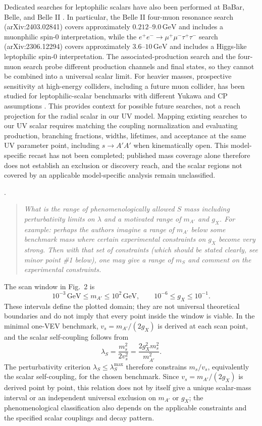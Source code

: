 \documentclass[12pt,a4paper]{article}
\begin{document}
Dedicated searches for leptophilic scalars have also been performed at BaBar, Belle, and Belle II \cite{BaBar:2020jma,Belle:2022gbl,Belle-II:2024wtd,Belle-II:2023ydz}. In particular, the Belle II four-muon resonance search (arXiv:2403.02841) covers approximately \(0.212\text{--}9.0\,\mathrm{GeV}\) and includes a muonphilic spin-0 interpretation, while the \(e^+e^-\to\mu^+\mu^-\tau^+\tau^-\) search (arXiv:2306.12294) covers approximately \(3.6\text{--}10\,\mathrm{GeV}\) and includes a Higgs-like leptophilic spin-0 interpretation. The associated-production search and the four-muon search probe different production channels and final states, so they cannot be combined into a universal scalar limit. For heavier masses, prospective sensitivity at high-energy colliders, including a future muon collider, has been studied for leptophilic-scalar benchmarks with different Yukawa and CP assumptions \cite{Chen:2021leptophilic}. This provides context for possible future searches, not a reach projection for the radial scalar in our UV model. Mapping existing searches to our UV scalar requires matching the coupling normalization and evaluating production, branching fractions, widths, lifetimes, and acceptance at the same UV parameter point, including \(s\to A'A'\) when kinematically open. This model-specific recast has not been completed; published mass coverage alone therefore does not establish an exclusion or discovery reach, and the scalar regions not covered by an applicable model-specific analysis remain unclassified.

\medskip
{}. \begin{quote}\itshape
What is the range of phenomenologically allowed \(S\) mass including perturbativity limits on \(\lambda\) and a motivated range of \(m_{A'}\) and \(g_X\). For example: perhaps the authors imagine a range of \(m_{A'}\) below some benchmark mass where certain experimental constraints on \(g_X\) become very strong. Then with that set of constraints (which should be stated clearly, see minor point \#1 below), one may give a range of \(m_S\) and comment on the experimental constraints.\end{quote}

The scan window in Fig.~2 is
\[
10^{-3}\,\mathrm{GeV}\leq m_{A'}\leq10^2\,\mathrm{GeV},
\qquad
10^{-6}\leq g_X\leq10^{-1}.
\]
These intervals define the plotted domain; they are not universal theoretical boundaries and do not imply that every point inside the window is viable. In the minimal one-VEV benchmark, \(v_s=m_{A'}/(2g_X)\) is derived at each scan point, and the scalar self-coupling follows from
\[
\lambda_S=\frac{m_s^2}{2v_s^2}
=\frac{2g_X^2m_s^2}{m_{A'}^2}.
\]
The perturbativity criterion \(\lambda_S\leq\lambda_S^{\max}\) therefore constrains \(m_s/v_s\), equivalently the scalar self-coupling, for the chosen benchmark. Since \(v_s=m_{A'}/(2g_X)\) is derived point by point, this relation does not by itself give a unique scalar-mass interval or an independent universal exclusion on \(m_{A'}\) or \(g_X\); the phenomenological classification also depends on the applicable constraints and the specified scalar couplings and decay pattern.
\end{document}
